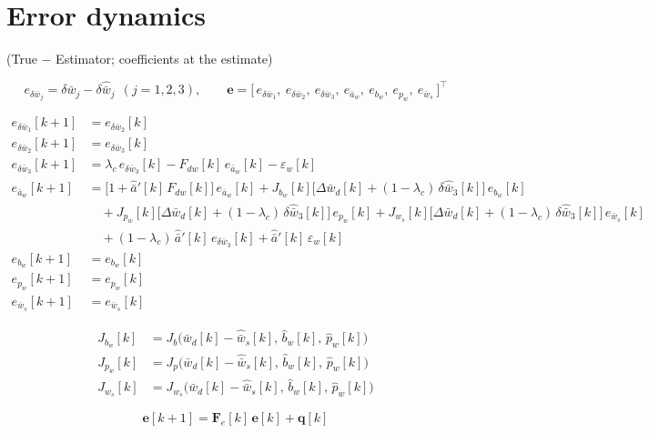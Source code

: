 \documentclass[11pt,a4paper,fontset=none]{ctexart}
\begin{document}
\section{Error dynamics}

(True $-$ Estimator; coefficients at the estimate)

\begin{equation*}
e_{\delta\bar{w}_j} = \delta\bar{w}_j - \delta\hat{\bar{w}}_j
\ \ (j = 1,2,3),
\qquad
\mathbf{e} = \bigl[\,e_{\delta\bar{w}_1},\ e_{\delta\bar{w}_2},\
e_{\delta\bar{w}_3},\ e_{\bar{a}_w},\ e_{b_w},\ e_{p_w},\
e_{\bar{w}_s}\,\bigr]^{\top}
\end{equation*}

\begin{align*}
e_{\delta\bar{w}_1}[k+1] &= e_{\delta\bar{w}_2}[k] \\
e_{\delta\bar{w}_2}[k+1] &= e_{\delta\bar{w}_3}[k] \\
e_{\delta\bar{w}_3}[k+1] &= \lambda_c\,e_{\delta\bar{w}_3}[k]
  - F_{dw}[k]\,e_{\bar{a}_w}[k] - \varepsilon_w[k] \\
e_{\bar{a}_w}[k+1]
  &= \bigl[1 + \hat{\bar{a}}'[k]\,F_{dw}[k]\bigr]\,e_{\bar{a}_w}[k]
   + J_{b_w}[k]\bigl[\Delta\bar{w}_d[k]
     + (1-\lambda_c)\,\delta\hat{\bar{w}}_3[k]\bigr]\,e_{b_w}[k] \\
  &\quad + J_{p_w}[k]\bigl[\Delta\bar{w}_d[k]
     + (1-\lambda_c)\,\delta\hat{\bar{w}}_3[k]\bigr]\,e_{p_w}[k]
   + J_{w_s}[k]\bigl[\Delta\bar{w}_d[k]
     + (1-\lambda_c)\,\delta\hat{\bar{w}}_3[k]\bigr]\,e_{\bar{w}_s}[k] \\
  &\quad + (1-\lambda_c)\,\hat{\bar{a}}'[k]\,e_{\delta\bar{w}_3}[k]
   + \hat{\bar{a}}'[k]\,\varepsilon_w[k] \\
e_{b_w}[k+1] &= e_{b_w}[k] \\
e_{p_w}[k+1] &= e_{p_w}[k] \\
e_{\bar{w}_s}[k+1] &= e_{\bar{w}_s}[k]
\end{align*}

\begin{align*}
J_{b_w}[k] &= J_b\bigl(\bar{w}_d[k]-\hat{\bar{w}}_s[k],\,
  \hat{b}_w[k],\, \hat{p}_w[k]\bigr) \\
J_{p_w}[k] &= J_p\bigl(\bar{w}_d[k]-\hat{\bar{w}}_s[k],\,
  \hat{b}_w[k],\, \hat{p}_w[k]\bigr) \\
J_{w_s}[k] &= J_{w_s}\bigl(\bar{w}_d[k]-\hat{\bar{w}}_s[k],\,
  \hat{b}_w[k],\, \hat{p}_w[k]\bigr)
\end{align*}

\begin{equation*}
\mathbf{e}[k+1] = \mathbf{F}_e[k]\,\mathbf{e}[k] + \mathbf{q}[k]
\end{equation*}
\end{document}
